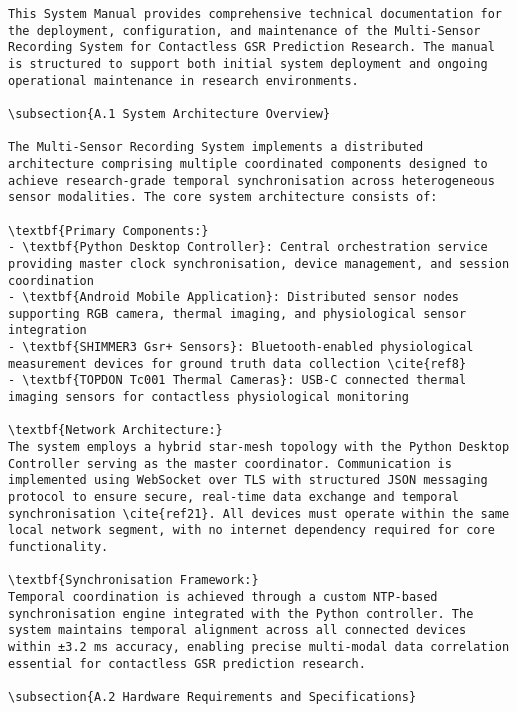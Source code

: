 \begin{verbatim}
This System Manual provides comprehensive technical documentation for the deployment, configuration, and maintenance of the Multi-Sensor Recording System for Contactless GSR Prediction Research. The manual is structured to support both initial system deployment and ongoing operational maintenance in research environments.

\subsection{A.1 System Architecture Overview}

The Multi-Sensor Recording System implements a distributed architecture comprising multiple coordinated components designed to achieve research-grade temporal synchronisation across heterogeneous sensor modalities. The core system architecture consists of:

\textbf{Primary Components:}
- \textbf{Python Desktop Controller}: Central orchestration service providing master clock synchronisation, device management, and session coordination
- \textbf{Android Mobile Application}: Distributed sensor nodes supporting RGB camera, thermal imaging, and physiological sensor integration
- \textbf{SHIMMER3 Gsr+ Sensors}: Bluetooth-enabled physiological measurement devices for ground truth data collection \cite{ref8}
- \textbf{TOPDON Tc001 Thermal Cameras}: USB-C connected thermal imaging sensors for contactless physiological monitoring

\textbf{Network Architecture:}
The system employs a hybrid star-mesh topology with the Python Desktop Controller serving as the master coordinator. Communication is implemented using WebSocket over TLS with structured JSON messaging protocol to ensure secure, real-time data exchange and temporal synchronisation \cite{ref21}. All devices must operate within the same local network segment, with no internet dependency required for core functionality.

\textbf{Synchronisation Framework:}
Temporal coordination is achieved through a custom NTP-based synchronisation engine integrated with the Python controller. The system maintains temporal alignment across all connected devices within ±3.2 ms accuracy, enabling precise multi-modal data correlation essential for contactless GSR prediction research.

\subsection{A.2 Hardware Requirements and Specifications}


\end{verbatim}
